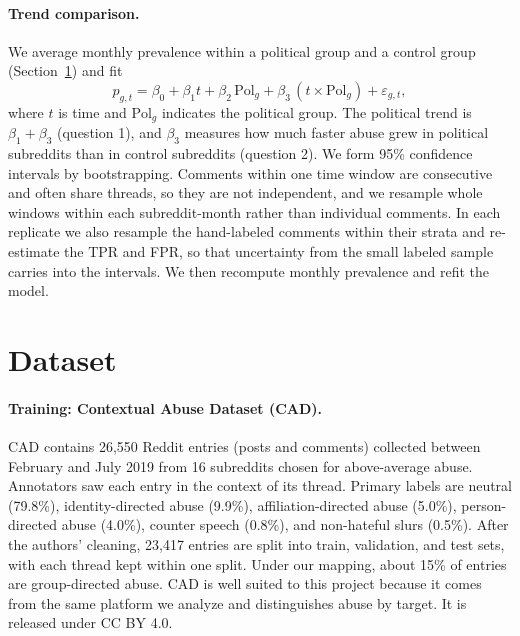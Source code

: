 \documentclass{article}
\begin{document}
\paragraph{Trend comparison.} We average monthly prevalence within a political group and a control group (Section~\ref{sec:data}) and fit
\[
  p_{g,t} = \beta_0 + \beta_1 t + \beta_2 \,\mathrm{Pol}_g + \beta_3 \,(t \times \mathrm{Pol}_g) + \varepsilon_{g,t},
\]
where $t$ is time and $\mathrm{Pol}_g$ indicates the political group.
The political trend is $\beta_1 + \beta_3$ (question 1), and $\beta_3$ measures how much faster abuse grew in political subreddits than in control subreddits (question 2).
We form 95\% confidence intervals by bootstrapping.
Comments within one time window are consecutive and often share threads, so they are not independent, and we resample whole windows within each subreddit-month rather than individual comments.
In each replicate we also resample the hand-labeled comments within their strata and re-estimate the TPR and FPR, so that uncertainty from the small labeled sample carries into the intervals.
We then recompute monthly prevalence and refit the model.

\section{Dataset}
\label{sec:data}

\paragraph{Training: Contextual Abuse Dataset (CAD).} CAD \citep{vidgen2021} contains 26,550 Reddit entries (posts and comments) collected between February and July 2019 from 16 subreddits chosen for above-average abuse.
Annotators saw each entry in the context of its thread.
Primary labels are neutral (79.8\%), identity-directed abuse (9.9\%), affiliation-directed abuse (5.0\%), person-directed abuse (4.0\%), counter speech (0.8\%), and non-hateful slurs (0.5\%).
After the authors' cleaning, 23,417 entries are split into train, validation, and test sets, with each thread kept within one split.
Under our mapping, about 15\% of entries are group-directed abuse.
CAD is well suited to this project because it comes from the same platform we analyze and distinguishes abuse by target.
It is released under CC BY 4.0.
\end{document}
